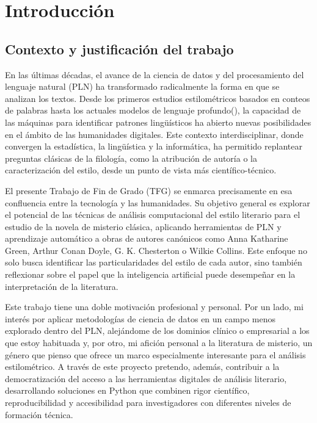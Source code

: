 \documentclass[IB]{TFUOC}%
\begin{document}
\vspace{2em}

\cleardoublepage

\chapter{Introducción}

\section{Contexto y justificación del trabajo}

En las últimas décadas, el avance de la ciencia de datos y del procesamiento del lenguaje natural (PLN) ha transformado radicalmente la forma en que se analizan los textos. Desde los primeros estudios estilométricos basados en conteos de palabras\cite{mendenhall1887characteristic} hasta los actuales modelos de lenguaje profundo(\cite{huang2024can, mikros2023ai, chen2021stylometric}), la capacidad de las máquinas para identificar patrones lingüísticos ha abierto nuevas posibilidades en el ámbito de las humanidades digitales. Este contexto interdisciplinar, donde convergen la estadística, la lingüística y la informática, ha permitido replantear preguntas clásicas de la filología, como la atribución de autoría o la caracterización del estilo, desde un punto de vista más científico-técnico.

El presente Trabajo de Fin de Grado (TFG) se enmarca precisamente en esa confluencia entre la tecnología y las humanidades. Su objetivo general es explorar el potencial de las técnicas de análisis computacional del estilo literario para el estudio de la novela de misterio clásica, aplicando herramientas de PLN y aprendizaje automático a obras de autores canónicos como Anna Katharine Green, Arthur Conan Doyle, G. K. Chesterton o Wilkie Collins. Este enfoque no solo busca identificar las particularidades del estilo de cada autor, sino también reflexionar sobre el papel que la inteligencia artificial puede desempeñar en la interpretación de la literatura.

Este trabajo tiene una doble motivación profesional y personal. Por un lado, mi interés por aplicar metodologías de ciencia de datos en un campo menos explorado dentro del PLN, alejándome de los dominios clínico o empresarial a los que estoy habituada y, por otro, mi afición personal a la literatura de misterio, un género que pienso que ofrece un marco especialmente interesante para el análisis estilométrico. A través de este proyecto pretendo, además, contribuir a la democratización del acceso a las herramientas digitales de análisis literario, desarrollando soluciones en Python que combinen rigor científico, reproducibilidad y accesibilidad para investigadores con diferentes niveles de formación técnica.
\end{document}
